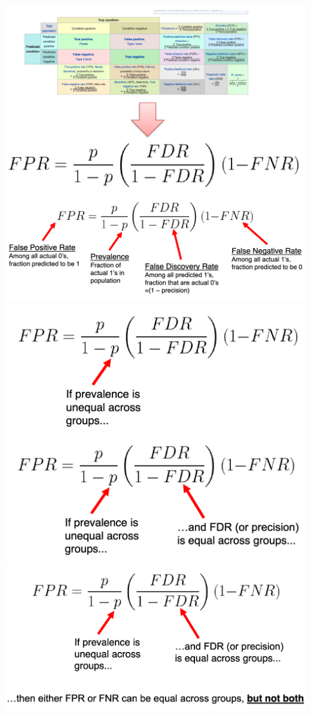 \documentclass[11pt]{article}
\theoremstyle{definition}
\begin{document}
\includegraphics[width=\textwidth/2-2.08049pt]{6.png}
\includegraphics[width=\textwidth/2]{7.png}
\includegraphics[width=\textwidth/2]{8.png}
\includegraphics[width=\textwidth/2]{9.png}
\includegraphics[width=\textwidth/2]{10.png}
\end{document}

